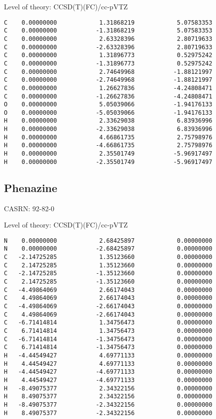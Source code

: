 \documentclass[journal=jctcce,manuscript=article,layout=traditional]{achemso}
\newcommand{\TZ}{cc-pVTZ}
\begin{document}
\begin{singlespace}
\noindent  Level of theory: CCSD(T)(FC)/{\TZ}
\begin{verbatim}
C    0.00000000            1.31868219            5.07583353
C    0.00000000           -1.31868219            5.07583353
C    0.00000000            2.63328396            2.80719633
C    0.00000000           -2.63328396            2.80719633
C    0.00000000            1.31896773            0.52975242
C    0.00000000           -1.31896773            0.52975242
C    0.00000000            2.74649968           -1.88121997
C    0.00000000           -2.74649968           -1.88121997
C    0.00000000            1.26627836           -4.24808471
C    0.00000000           -1.26627836           -4.24808471
O    0.00000000            5.05039066           -1.94176133
O    0.00000000           -5.05039066           -1.94176133
H    0.00000000            2.33629038            6.83936996
H    0.00000000           -2.33629038            6.83936996
H    0.00000000            4.66861735            2.75798976
H    0.00000000           -4.66861735            2.75798976
H    0.00000000            2.35501749           -5.96917497
H    0.00000000           -2.35501749           -5.96917497
\end{verbatim}
\end{singlespace}

\subsection{Phenazine}

CASRN: 92-82-0

\begin{singlespace}
\noindent Level of theory: CCSD(T)(FC)/{\TZ}
\begin{verbatim}
N    0.00000000            2.68425897            0.00000000
N    0.00000000           -2.68425897            0.00000000
C   -2.14725285            1.35123660            0.00000000
C    2.14725285            1.35123660            0.00000000
C   -2.14725285           -1.35123660            0.00000000
C    2.14725285           -1.35123660            0.00000000
C   -4.49864069            2.66174043            0.00000000
C    4.49864069            2.66174043            0.00000000
C   -4.49864069           -2.66174043            0.00000000
C    4.49864069           -2.66174043            0.00000000
C   -6.71414814            1.34756473            0.00000000
C    6.71414814            1.34756473            0.00000000
C   -6.71414814           -1.34756473            0.00000000
C    6.71414814           -1.34756473            0.00000000
H   -4.44549427            4.69771133            0.00000000
H    4.44549427            4.69771133            0.00000000
H   -4.44549427           -4.69771133            0.00000000
H    4.44549427           -4.69771133            0.00000000
H   -8.49075377            2.34322156            0.00000000
H    8.49075377            2.34322156            0.00000000
H   -8.49075377           -2.34322156            0.00000000
H    8.49075377           -2.34322156            0.00000000
\end{verbatim}
\end{singlespace}
\end{document}
